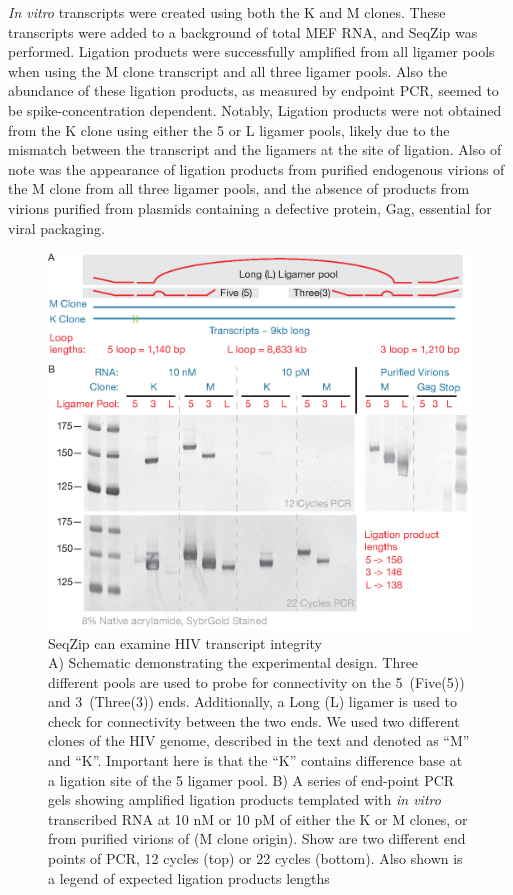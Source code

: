     \textit{In vitro} transcripts were created using both the K and M clones. These transcripts were added to a background of total MEF RNA, and SeqZip was performed. Ligation products were successfully amplified from all ligamer pools when using the M clone transcript and all three ligamer pools. Also the abundance of these ligation products, as measured by endpoint PCR, seemed to be spike-concentration dependent. Notably, Ligation products were not obtained from the K clone using either the 5 or L ligamer pools, likely due to the mismatch between the transcript and the ligamers at the site of ligation. Also of note was the appearance of ligation products from purified endogenous virions of the M clone from all three ligamer pools, and the absence of products from virions purified from plasmids containing a defective protein, Gag, essential for viral packaging. 

	  \begin{figure} %
  	  \centering 
	    \includegraphics{Figures/SeqZipMethod/HIVviaSeqZip.eps}
    	\caption[SeqZip can examine HIV transcript integrity]
    	{
	      SeqZip can examine HIV transcript integrity\\[0.25cm]
      	A) Schematic demonstrating the experimental design. Three different pools are used to probe for connectivity on the 5\textprime~(Five(5)) and 3\textprime~(Three(3)) ends. Additionally, a Long (L) ligamer is used to check for connectivity between the two ends. We used two different clones of the HIV genome, described in the text and denoted as ``M'' and ``K''. Important here is that the ``K'' contains difference base at a ligation site of the 5 ligamer pool.
        B) A series of end-point PCR gels showing amplified ligation products templated with \textit{in vitro} transcribed RNA at 10 nM or 10 pM of either the K or M clones, or from purified virions of (M clone origin). Show are two different end points of PCR, 12 cycles (top) or 22 cycles (bottom). Also shown is a legend of expected ligation products lengths
    		}
    	\label{SeqZipMethod:fig:Hiv tx via SeqZip}
  		\end{figure}

